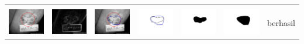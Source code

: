 \begin{table}[H]
\begin{tabular}{|m{0.7in}|m{0.7in}|m{0.7in}|m{0.7in}|m{0.7in}|m{0.7in}|m{0.7in}|}
		&  &  & & & &  \\
		\includegraphics[width=0.7in]{dataset/dataset_3/luka_kuning/ready/38_interp_init.jpg}&
		\includegraphics[width=0.7in]{dataset/dataset_3/luka_kuning/ready/38_interp_ext.jpg}&
		\includegraphics[width=0.7in]{dataset/dataset_3/luka_kuning/ready/38_interp_result.jpg}&
		\includegraphics[width=0.7in]{dataset/dataset_3/luka_kuning/ready/38_gt_r.jpg}&
		\includegraphics[width=0.7in]{dataset/dataset_3/luka_kuning/ready/38_r.jpg}&
		\includegraphics[width=0.7in]{dataset/dataset_3/luka_kuning/ready/38_interp_r.jpg}&
		berhasil\\
		\hline
		

\end{tabular}
\end{table}
